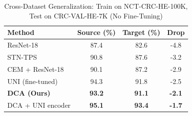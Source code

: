 \begin{table}[t]
\centering
\caption{Cross-Dataset Generalization: Train on NCT-CRC-HE-100K, Test on CRC-VAL-HE-7K (No Fine-Tuning)}
\label{tab:generalization}
\begin{tabularx}{\textwidth}{Xccc}
\hline
\textbf{Method} & \textbf{Source (\%)} & \textbf{Target (\%)} & \textbf{Drop} \\
\hline
ResNet-18 & 87.4 & 82.6 & -4.8 \\
STN-TPS & 90.8 & 87.6 & -3.2 \\
CEM + ResNet-18 & 90.1 & 87.2 & -2.9 \\
UNI (fine-tuned) & 94.3 & 91.8 & -2.5 \\
\textbf{DCA (Ours)} & \textbf{93.2} & \textbf{91.1} & \textbf{-2.1} \\
DCA + UNI encoder & \textbf{95.1} & \textbf{93.4} & \textbf{-1.7} \\
\hline
\end{tabularx}
\end{table}